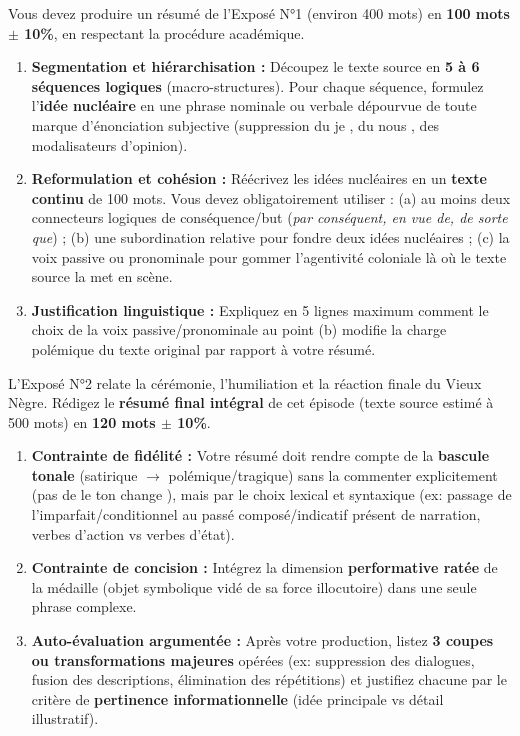 \documentclass[11pt]{article}
\begin{document}
\begin{exercice}
Vous devez produire un résumé de l'Exposé N°1 (environ 400 mots) en \textbf{100 mots $\pm$ 10\%}, en respectant la procédure académique.
\begin{enumerate}
    \item \textbf{Segmentation et hiérarchisation :} Découpez le texte source en \textbf{5 à 6 séquences logiques} (macro-structures). Pour chaque séquence, formulez l'\textbf{idée nucléaire} en une phrase nominale ou verbale dépourvue de toute marque d'énonciation subjective (suppression du \og je \fg{}, du \og nous \fg{}, des modalisateurs d'opinion).
    \item \textbf{Reformulation et cohésion :} Réécrivez les idées nucléaires en un \textbf{texte continu} de 100 mots. Vous devez obligatoirement utiliser : (a) au moins deux connecteurs logiques de conséquence/but (\textit{par conséquent, en vue de, de sorte que}) ; (b) une subordination relative pour fondre deux idées nucléaires ; (c) la voix passive ou pronominale pour gommer l'agentivité coloniale là où le texte source la met en scène.
    \item \textbf{Justification linguistique :} Expliquez en 5 lignes maximum comment le choix de la voix passive/pronominale au point (b) modifie la charge polémique du texte original par rapport à votre résumé.
\end{enumerate}
\end{exercice}

\begin{exercice}
L'Exposé N°2 relate la cérémonie, l'humiliation et la réaction finale du Vieux Nègre. Rédigez le \textbf{résumé final intégral} de cet épisode (texte source estimé à 500 mots) en \textbf{120 mots $\pm$ 10\%}.
\begin{enumerate}
    \item \textbf{Contrainte de fidélité :} Votre résumé doit rendre compte de la \textbf{bascule tonale} (satirique $\rightarrow$ polémique/tragique) sans la commenter explicitement (pas de \og le ton change \fg{}), mais par le choix lexical et syntaxique (ex: passage de l'imparfait/conditionnel au passé composé/indicatif présent de narration, verbes d'action vs verbes d'état).
    \item \textbf{Contrainte de concision :} Intégrez la dimension \textbf{performative ratée} de la médaille (objet symbolique vidé de sa force illocutoire) dans une seule phrase complexe.
    \item \textbf{Auto-évaluation argumentée :} Après votre production, listez \textbf{3 coupes ou transformations majeures} opérées (ex: suppression des dialogues, fusion des descriptions, élimination des répétitions) et justifiez chacune par le critère de \textbf{pertinence informationnelle} (idée principale vs détail illustratif).
\end{enumerate}
\end{exercice}
\end{document}
